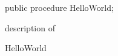 \documentclass{report}
\newif\ifpdf
\begin{document}
\label{ok_class_record_helpers.TDescendantClassHelper-HelloWorld}
\begin{list}{}{
\setlength{\itemindent}{0cm}
\setlength{\listparindent}{0cm}
\setlength{\leftmargin}{\evensidemargin}
\addtolength{\leftmargin}{\tmplength}
\settowidth{\labelsep}{X}
\addtolength{\leftmargin}{\labelsep}
\setlength{\labelwidth}{\tmplength}
}
\item[\textbf{Declaration}\hfill]
\ifpdf
\begin{flushleft}
\fi
\begin{ttfamily}
public procedure HelloWorld;\end{ttfamily}

\ifpdf
\end{flushleft}
\fi

\par
\item[\textbf{Description}]
description of \begin{ttfamily}HelloWorld\end{ttfamily}

\end{list}
\end{document}

